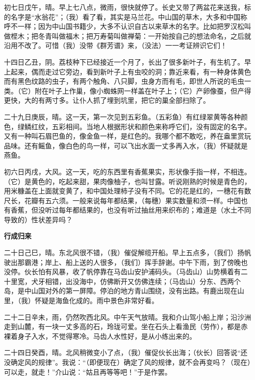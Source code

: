 \documentclass[12pt,UTF-8,openany]{ctexbook}
\begin{document}
\begin{normalsize}
    初七日戊午，晴。早上七八点，微雨，很快就停了。长史又带了两盆花来送我，标的名字是“水翁花”；（我）看了看，其实是马兰花。中山国的草木，大多和中国称呼不一样；因为中山国书籍少，大多不认识自古以来草木的名字。比如把罗汉松叫做㭴木；把冬青叫做福木；把万寿菊叫做禅菊：一开始按自己的想法命名，之后就沿用不改了。可惜（我）没带《群芳谱》来，（没法）一一考证辨识它们！
    
    十四日乙丑，阴。荔枝种下已经接近一个月了，长出了很多新叶子，有生机了。早上起来，偶而走过它旁边，看到新叶子上有虫咬的洞；靠近来看，有一种身体黄色而有黑色纹路的虫子，有两个触角、八只脚，虫身方而有毛，即世人所说的毛虫一类。（它）附在叶子上作巢，像小蜘蛛网一样盖在叶子上；（它）产卵像蚕，但产得更快，大的有两寸多。让仆人抓了埋到坑里，把它的巢全部扫除了。
    
    二十九日庚辰，晴。这一天，第一次见到五彩鱼。（五彩鱼）有红绿翠黄等各种颜色，绿鳞红纹，五彩相间。当地人根据形状和颜色来称呼它们，没有固定的名字。又有一种叫石眉巴鱼的，像金鱼一样，是红色的。我哪个都不敢吃，养在盎里赏玩品味。还有鳐鱼，像白色的鸟一样，可以飞出水面一丈多再入水，（我）怀疑就是燕鱼。
    
    初六日丙戌，大风。这一天，吃的东西里有香蕉果实，形状像手指一样，不相连。（它）是黄色的，吃起来甜，果肉像柚子，也叫甘露。听说刚熟的时候是青色的，用米糠盖在上面就变黄了，和中国处理柿子没有不同。它的花是红的，一穗花有数尺长，花瓣有五六须。一般来说每年都结果，（每穗）果实数量和须一样。中国也有香蕉，但没听过每年都结果的，也没有听过抽丝用来织布的；难道是（水土不同导致的）性状差异吗？
    
    \begin{center}{\Large\textbf{行成归来}}\end{center}
    
    二十日己巳，晴。东北风很不错，（我）催促解缆开船。早上五点多，（我们）扬帆驶出那霸港；岸上、船上送的人很多，（我们）挥手辞谢。中午下雨，到了傍晚也没停。伙长怕有风暴，收了帆停靠在马齿山安护浦码头。（马齿山）山势横着有二十里宽，犬牙相错，出没海中，仿佛断开又仿佛连续；（马齿山）分东、西两个岛，是中山国对外的第一屏障。停泊的地方青山围绕，没有出路。有鹿出现在山里，（我）怀疑是海鱼化成的。雨中景色非常好看。
    
    二十二日辛未，雨，仍然吹西北风。中午天气放晴。我和介山驾小船上岸；沿沙洲走到山麓，有一块一丈多高的石，玲珑可爱。坐在石头上看渔民（劳作），都是赤裸着身子入水，不觉得寒冷。马齿人水性好，是从小练出来的。
    
    二十四日癸酉，晴。北风稍微变小了点，（我）催促伙长出海；（伙长）回答说“还没确定风的规律”。我说：“（即便现在）确定了风的规律，就不会再变吗？（现在）可以走，就走！”介山说：“姑且再等等吧！”于是作罢。
    

\end{normalsize}
\end{document}
